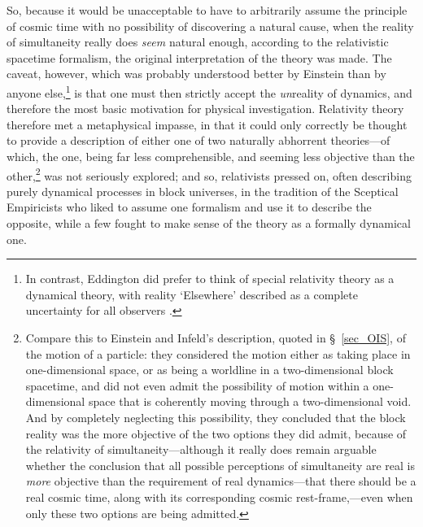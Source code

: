 So, because it would be unacceptable to have to arbitrarily assume the principle of cosmic time with no possibility of discovering a natural cause, when the reality of simultaneity really does \textit{seem} natural enough, according to the relativistic spacetime formalism, the original interpretation of the theory was made. The caveat, however, which was probably understood better by Einstein than by anyone else,\footnote{In contrast, Eddington did prefer to think of special relativity theory as a dynamical theory, with reality `Elsewhere' described as a complete uncertainty for all observers \cite{Eddington1929}.} is that one must then strictly accept the \textit{un}reality of dynamics, and therefore the most basic motivation for physical investigation. Relativity theory therefore met a metaphysical impasse, in that it could only correctly be thought to provide a description of either one of two naturally abhorrent theories---of which, the one, being far less comprehensible, and seeming less objective than the other,\footnote{Compare this to Einstein and Infeld's description, quoted in \S~\ref{sec_OIS}, of the motion of a particle: they considered the motion either as taking place in one-dimensional space, or as being a worldline in a two-dimensional block spacetime, and did not even admit the possibility of motion within a one-dimensional space that is coherently moving through a two-dimensional void. And by completely neglecting this possibility, they concluded that the block reality was the more objective of the two options they did admit, because of the relativity of simultaneity---although it really does remain arguable whether the conclusion that all possible perceptions of simultaneity are real is \textit{more} objective than the requirement of real dynamics---that there should be a real cosmic time, along with its corresponding cosmic rest-frame,---even when only these two options are being admitted.} was not seriously explored; and so, relativists pressed on, often describing purely dynamical processes in block universes, in the tradition of the Sceptical Empiricists who liked to assume one formalism and use it to describe the opposite, while a few fought to make sense of the theory as a formally dynamical one. 

